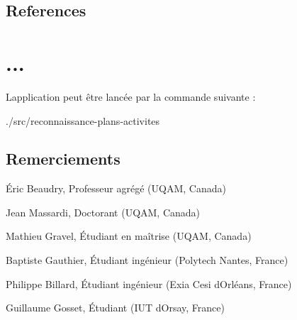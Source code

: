 \subsection*{References}

\section*{... }

L\textquotesingle{}application peut être lancée par la commande suivante \+:


\begin{DoxyCode}
./src/reconnaissance-plans-activites
\end{DoxyCode}


\subsection*{Remerciements}


\begin{DoxyItemize}
\item Éric Beaudry, Professeur agrégé (U\+Q\+AM, Canada)
\item Jean Massardi, Doctorant (U\+Q\+AM, Canada)
\item Mathieu Gravel, Étudiant en maîtrise (U\+Q\+AM, Canada)
\item Baptiste Gauthier, Étudiant ingénieur (Polytech Nantes, France)
\item Philippe Billard, Étudiant ingénieur (Exia Cesi d\textquotesingle{}Orléans, France)
\item Guillaume Gosset, Étudiant (I\+UT d\textquotesingle{}Orsay, France) 
\end{DoxyItemize}